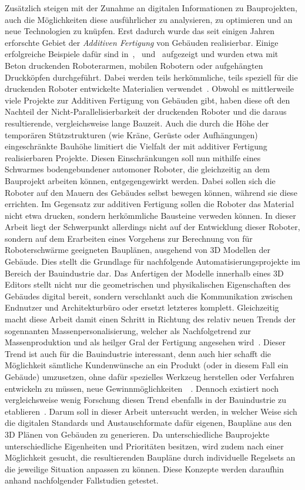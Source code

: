 Zusätzlich steigen mit der Zunahme an digitalen Informationen zu Bauprojekten, auch die Möglichkeiten diese ausführlicher zu analysieren, zu optimieren und an neue Technologien zu knüpfen.
Erst dadurch wurde das seit einigen Jahren erforschte Gebiet der \textit{Additiven Fertigung} von Gebäuden realisierbar.
Einige erfolgreiche Beispiele dafür sind in~\cite{AdditiveManufactoringDelgado},~\cite{AdditiveManufacturingUsingMobileRobots} und~\cite{Tankova2020} aufgezeigt und wurden etwa mit Beton druckenden Roboterarmen, mobilen Robotern oder aufgehängten Druckköpfen durchgeführt.
Dabei werden teils herkömmliche, teils speziell für die druckenden Roboter entwickelte Materialien verwendet~\cite{Tankova2020}.
Obwohl es mittlerweile viele Projekte zur Additiven Fertigung von Gebäuden gibt, haben diese oft den Nachteil der Nicht-Parallelisierbarkeit der druckenden Roboter und die daraus resultierende, vergleichsweise lange Bauzeit.
Auch die durch die Höhe der temporären Stützstrukturen (wie Kräne, Gerüste oder Aufhängungen) eingeschränkte Bauhöhe limitiert die Vielfalt der mit additiver Fertigung realisierbaren Projekte.
Diesen Einschränkungen soll nun mithilfe eines Schwarmes bodengebundener automoner Roboter, die gleichzeitig an dem Bauprojekt arbeiten können, entgegengewirkt werden.
Dabei sollen sich die Roboter auf den Mauern des Gebäudes selbst bewegen können, während sie diese errichten.
Im Gegensatz zur additiven Fertigung sollen die Roboter das Material nicht etwa drucken, sondern herkömmliche Bausteine verweden können.
In dieser Arbeit liegt der Schwerpunkt allerdings nicht auf der Entwicklung dieser Roboter, sondern auf dem Erarbeiten eines Vorgehens zur Berechnung von für Roboterschwärme geeigneten Bauplänen, ausgehend von 3D Modellen der Gebäude.
Dies stellt die Grundlage für nachfolgende Automatisierungsprojekte im Bereich der Bauindustrie dar.
Das Anfertigen der Modelle innerhalb eines 3D Editors stellt nicht nur die geometrischen und physikalischen Eigenschaften des Gebäudes digital bereit, sondern verschlankt auch die Kommunikation zwischen Endnutzer und Architekturbüro oder ersetzt letzteres komplett.
Gleichzeitig macht diese Arbeit damit einen Schritt in Richtung des relativ neuen Trends der sogennanten Massenpersonalisierung, welcher als Nachfolgetrend zur Massenproduktion und als \glqq{}heilger Gral\grqq{} der Fertigung angesehen wird~\cite{MassCustomHolyGrail}.
Dieser Trend ist auch für die Bauindustrie interessant, denn auch hier schafft die Möglichkeit sämtliche Kundenwünsche an ein Produkt (oder in diesem Fall ein Gebäude) umzusetzen, ohne dafür spezielles Werkzeug herstellen oder Verfahren entwickeln zu müssen, neue Gewinnmöglichkeiten~\cite{Jensen2018}~\cite{Jensen2015}.
Dennoch existiert noch vergleichsweise wenig Forschung diesen Trend ebenfalls in der Bauindustrie zu etablieren~\cite{Larsen2019}.
Darum soll in dieser Arbeit untersucht werden, in welcher Weise sich die digitalen Standards und Austauschformate dafür eigenen, Baupläne aus den 3D Plänen von Gebäuden zu generieren.
Da unterschiedliche Bauprojekte unterschiedliche Eigenheiten und Prioritäten besitzen, wird zudem nach einer Möglichkeit gesucht, die resultierenden Baupläne durch individuelle Regelsets an die jeweilige Situation anpassen zu können.
Diese Konzepte werden daraufhin anhand nachfolgender Fallstudien getestet.